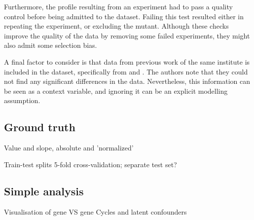 Furthermore, the profile resulting from an experiment had to pass a quality control before being admitted to the dataset. Failing this test resulted either in repeating the experiment, or excluding the mutant. Although these checks improve the quality of the data by removing some failed experiments, they might also admit some selection bias.

A final factor to consider is that  data from previous work of the same institute is included in the dataset, specifically from \citeauthor{lenstra2011specificity} and \citeauthor{van2010functional}. The authors note that they could not find any significant differences in the data. Nevertheless, this information can be seen as a context variable, and ignoring it can be an explicit modelling assumption.

\subsection*{Ground truth}
Value and slope, absolute and 'normalized'

Train-test splits
5-fold cross-validation; separate test set?

\subsection*{Simple analysis}
Visualisation of gene VS gene
Cycles and latent confounders